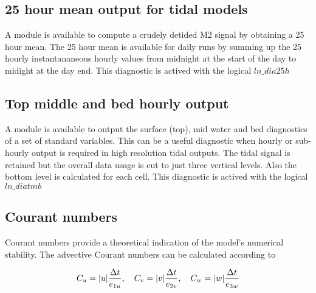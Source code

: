 \documentclass[../tex_main/NEMO_manual]{subfiles}
\begin{document}
\subsection{25 hour mean output for tidal models}


A module is available to compute a crudely detided M2 signal by obtaining a 25 hour mean.
The 25 hour mean is available for daily runs by summing up the 25 hourly instantananeous hourly values from
midnight at the start of the day to midight at the day end.
This diagnostic is actived with the logical  $ln\_dia25h$

\subsection{Top middle and bed hourly output}


A module is available to output the surface (top), mid water and bed diagnostics of a set of 
standard variables.
This can be a useful diagnostic when hourly or sub-hourly output is required in 
high resolution tidal outputs.
The tidal signal is retained but the overall data usage is cut to just three vertical levels.
Also the bottom level is calculated for each cell.
This diagnostic is actived with the logical  $ln\_diatmb$

\subsection{Courant numbers}

Courant numbers provide a theoretical indication of the model's numerical stability.
The advective Courant numbers can be calculated according to

\[	C_u = |u|\frac{\Delta t}{e_{1u}}, \quad C_v = |v|\frac{\Delta t}{e_{2v}}, \quad C_w = |w|\frac{\Delta t}{e_{3w}}
 \label{eq:CFL} \]
\end{document}

